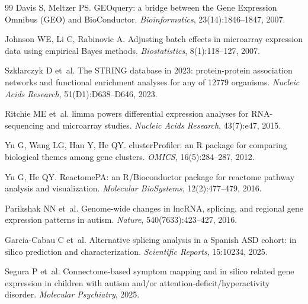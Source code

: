 \documentclass[10pt,twocolumn]{article}
\begin{document}
\begin{thebibliography}{99}
Davis S, Meltzer PS.
\newblock GEOquery: a bridge between the Gene Expression Omnibus (GEO) and BioConductor.
\newblock \textit{Bioinformatics}, 23(14):1846--1847, 2007.

Johnson WE, Li C, Rabinovic A.
\newblock Adjusting batch effects in microarray expression data using empirical Bayes methods.
\newblock \textit{Biostatistics}, 8(1):118--127, 2007.

Szklarczyk D et~al.
\newblock The STRING database in 2023: protein-protein association networks and functional
  enrichment analyses for any of 12779 organisms.
\newblock \textit{Nucleic Acids Research}, 51(D1):D638--D646, 2023.

Ritchie ME et~al.
\newblock limma powers differential expression analyses for RNA-sequencing and microarray studies.
\newblock \textit{Nucleic Acids Research}, 43(7):e47, 2015.

Yu G, Wang LG, Han Y, He QY.
\newblock clusterProfiler: an R package for comparing biological themes among gene clusters.
\newblock \textit{OMICS}, 16(5):284--287, 2012.

Yu G, He QY.
\newblock ReactomePA: an R/Bioconductor package for reactome pathway analysis and visualization.
\newblock \textit{Molecular BioSystems}, 12(2):477--479, 2016.

Parikshak NN et~al.
\newblock Genome-wide changes in lncRNA, splicing, and regional gene expression patterns in autism.
\newblock \textit{Nature}, 540(7633):423--427, 2016.

Garcia-Cabau C et~al.
\newblock Alternative splicing analysis in a Spanish ASD cohort: in silico prediction and
  characterization.
\newblock \textit{Scientific Reports}, 15:10234, 2025.

Segura P et~al.
\newblock Connectome-based symptom mapping and in silico related gene expression in children
  with autism and/or attention-deficit/hyperactivity disorder.
\newblock \textit{Molecular Psychiatry}, 2025.
\newblock {}

\end{thebibliography}
\end{document}
